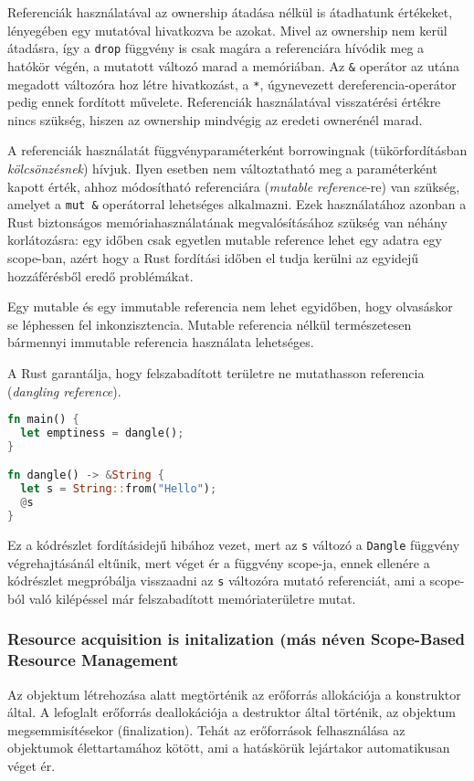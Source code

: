 Referenciák használatával az ownership átadása nélkül is átadhatunk értékeket, lényegében egy mutatóval hivatkozva be azokat. Mivel az ownership nem kerül átadásra, így a \lstinline{drop} függvény is csak magára a referenciára hívódik meg a hatókör végén, a mutatott változó marad a memóriában. Az \lstinline{&} operátor az utána megadott változóra hoz létre hivatkozást, a \lstinline{*}, úgynevezett dereferencia-operátor pedig ennek fordított művelete.
Referenciák használatával visszatérési értékre nincs szükség, hiszen az ownership mindvégig az eredeti ownerénél marad.

A referenciák használatát függvényparaméterként borrowingnak (tükörfordításban \textit{kölcsönzésnek}) hívjuk. Ilyen esetben nem változtatható meg a paraméterként kapott érték, ahhoz módosítható referenciára (\textit{mutable reference}-re) van szükség, amelyet a \lstinline{mut &} operátorral lehetséges alkalmazni. Ezek használatához azonban a Rust biztonságos memóriahasználatának megvalósításához szükség van néhány korlátozásra: egy időben csak egyetlen mutable reference lehet egy adatra egy scope-ban, azért hogy a Rust fordítási időben el tudja kerülni az egyidejű hozzáférésből eredő problémákat.

Egy mutable és egy immutable referencia nem lehet egyidőben, hogy olvasáskor se léphessen fel inkonzisztencia. Mutable referencia nélkül természetesen bármennyi immutable referencia használata lehetséges.

A Rust garantálja, hogy felszabadított területre ne mutathasson referencia (\textit{dangling reference}).
\begin{lstlisting}[language=Rust, style=boxed]
fn main() {
  let emptiness = dangle();
}

fn dangle() -> &String {
  let s = String::from("Hello");
  @s
}
\end{lstlisting}
Ez a kódrészlet fordításidejű hibához vezet, mert az \lstinline{s} változó a \lstinline{Dangle} függvény végrehajtásánál eltűnik, mert véget ér a függvény scope-ja, ennek ellenére a kódrészlet megpróbálja visszaadni az \lstinline{s} változóra mutató referenciát, ami a scope-ból való kilépéssel már felszabadított memóriaterületre mutat.

\subsubsection{Resource acquisition is initalization (más néven Scope-Based Resource Management}
Az objektum létrehozása alatt megtörténik az erőforrás allokációja a konstruktor által. A lefoglalt erőforrás deallokációja a destruktor által történik, az objektum megsemmisítésekor (finalization).  Tehát az erőforrások felhasználása az objektumok élettartamához kötött, ami a hatáskörük lejártakor automatikusan véget ér.

